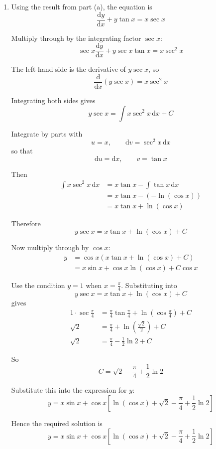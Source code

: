 \documentclass[leqno]{article}
\begin{document}
\begin{enumerate}[
  label=\textbf{\arabic*.},
  leftmargin=*,
  topsep=0pt,
  partopsep=0pt,
  parsep=0pt
]
\begin{tcolorbox}[colback=white, colframe=scarlet, title={\textbf{Solution}}, breakable, grow to left by=6mm, grow to right by=10mm]
\begin{enumerate}[label=\textbf{(\alph*)}]
Since $0<x<\frac{\pi}{2}$, we have $\cos x>0$, so $|\sec x|=\sec x$. Hence
\[
\mu(x)=e^{\ln(\sec x)}=\sec x
\]

Therefore an appropriate integrating factor is $\sec x$.

  \item Using the result from part (a), the equation is
\[
\frac{\mathrm{d}y}{\mathrm{d}x}+y\tan x=x\sec x
\]

Multiply through by the integrating factor $\sec x$:
\[
\sec x\frac{\mathrm{d}y}{\mathrm{d}x}+y\sec x\tan x=x\sec^2 x
\]

The left-hand side is the derivative of $y\sec x$, so
\[
\frac{\mathrm{d}}{\mathrm{d}x}(y\sec x)=x\sec^2 x
\]

Integrating both sides gives
\[
y\sec x=\int x\sec^2 x\,\mathrm{d}x+C
\]

Integrate by parts with
\[
u=x,\qquad \mathrm{d}v=\sec^2 x\,\mathrm{d}x
\]
so that
\[
\mathrm{d}u=\mathrm{d}x,\qquad v=\tan x
\]

Then
\begin{align*}
\int x\sec^2 x\,\mathrm{d}x
&=x\tan x-\int \tan x\,\mathrm{d}x \\
&=x\tan x-(-\ln(\cos x)) \\
&=x\tan x+\ln(\cos x)
\end{align*}

Therefore
\[
y\sec x=x\tan x+\ln(\cos x)+C
\]

Now multiply through by $\cos x$:
\begin{align*}
y&=\cos x\left(x\tan x+\ln(\cos x)+C\right) \\
&=x\sin x+\cos x\ln(\cos x)+C\cos x
\end{align*}

Use the condition $y=1$ when $x=\frac{\pi}{4}$. Substituting into
\[
y\sec x=x\tan x+\ln(\cos x)+C
\]
gives
\begin{align*}
1\cdot \sec\frac{\pi}{4}
&=\frac{\pi}{4}\tan\frac{\pi}{4}+\ln\left(\cos\frac{\pi}{4}\right)+C \\
\sqrt{2}
&=\frac{\pi}{4}+\ln\left(\frac{\sqrt{2}}{2}\right)+C \\
\sqrt{2}
&=\frac{\pi}{4}-\frac{1}{2}\ln 2+C
\end{align*}

So
\[
C=\sqrt{2}-\frac{\pi}{4}+\frac{1}{2}\ln 2
\]

Substitute this into the expression for $y$:
\[
y=x\sin x+\cos x\left[\ln(\cos x)+\sqrt{2}-\frac{\pi}{4}+\frac{1}{2}\ln 2\right]
\]

Hence the required solution is
\[
y=x\sin x+\cos x\left[\ln(\cos x)+\sqrt{2}-\frac{\pi}{4}+\frac{1}{2}\ln 2\right]
\]
  \end{enumerate}
\end{tcolorbox}



\end{enumerate}
\end{document}
